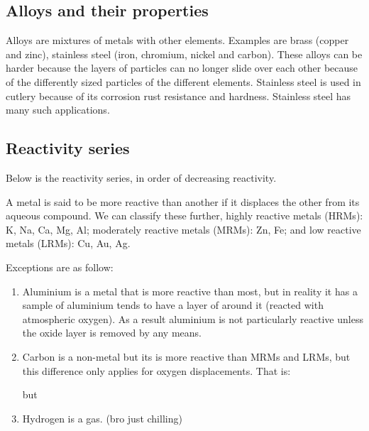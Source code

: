 \documentclass{article}
\begin{document}
\subsection{Alloys and their properties}
Alloys are mixtures of metals with other elements. Examples are brass (copper and zinc),
stainless steel (iron, chromium, nickel and carbon). These alloys can be harder because
the layers of particles can no longer slide over each other because of the differently
sized particles of the different elements. Stainless steel is used in cutlery because of
its corrosion rust resistance and hardness. Stainless steel has many such applications.

\subsection{Reactivity series}
Below is the reactivity series, in order of decreasing reactivity.

\begin{center}
\end{center}
A metal is said to be more reactive than another if it displaces the other from its 
aqueous compound. We can classify these further, highly reactive metals (HRMs): K, Na,
Ca, Mg, Al; moderately reactive metals (MRMs): Zn, Fe; and low reactive metals (LRMs):
Cu, Au, Ag.

Exceptions are as follow:
\begin{enumerate}
	\item Aluminium is a metal that is more reactive than most, but in reality it has
		a sample of aluminium tends to have a layer of  around it (reacted
		with atmospheric oxygen). As a result aluminium is not particularly reactive
		unless the oxide layer is removed by any means.
	\item Carbon is a non-metal but its is more reactive than MRMs and LRMs, but this
		difference only applies for oxygen displacements. That is:
		
		 but 

	\item Hydrogen is a gas. (bro just chilling)
\end{enumerate}
\end{document}
